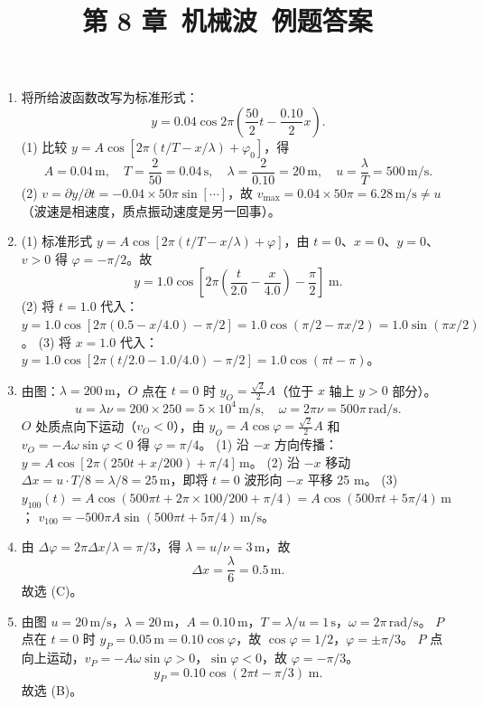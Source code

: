 \documentclass[12pt]{article}
\title{第 8 章\ 机械波\ 例题答案}
\author{}
\date{}
\begin{document}
\maketitle

\begin{enumerate}[label=\textbf{例\arabic*.}, leftmargin=*]

\item 将所给波函数改写为标准形式：
\[
  y = 0.04\cos 2\pi\!\left(\frac{50}{2}t-\frac{0.10}{2}x\right).
\]
(1) 比较 $y = A\cos[2\pi(t/T - x/\lambda)+\varphi_0]$，得
\[
  A = 0.04\,\mathrm{m},\quad T = \frac{2}{50} = 0.04\,\mathrm{s},\quad
  \lambda = \frac{2}{0.10}=20\,\mathrm{m},\quad u = \frac{\lambda}{T}=500\,\mathrm{m/s}.
\]
(2) $v = \partial y/\partial t = -0.04\times 50\pi\sin[\cdots]$，故 $v_{\max}=0.04\times 50\pi = 6.28\,\mathrm{m/s}\neq u$（波速是相速度，质点振动速度是另一回事）。

\item (1) 标准形式 $y = A\cos[2\pi(t/T - x/\lambda)+\varphi]$，由 $t=0$、$x=0$、$y=0$、$v>0$ 得 $\varphi=-\pi/2$。故
\[
  y = 1.0\cos\!\left[2\pi\!\left(\frac{t}{2.0}-\frac{x}{4.0}\right)-\frac{\pi}{2}\right]\;\mathrm{m}.
\]
(2) 将 $t=1.0$ 代入：$y=1.0\cos[2\pi(0.5-x/4.0)-\pi/2]=1.0\cos(\pi/2-\pi x/2)=1.0\sin(\pi x/2)$。
(3) 将 $x=1.0$ 代入：$y=1.0\cos[2\pi(t/2.0-1.0/4.0)-\pi/2]=1.0\cos(\pi t-\pi)$。

\item 由图：$\lambda=200\,\mathrm{m}$，$O$ 点在 $t=0$ 时 $y_O = \frac{\sqrt{2}}{2}A$（位于 $x$ 轴上 $y>0$ 部分）。
\[
  u = \lambda\nu = 200\times 250 = 5\times 10^4\,\mathrm{m/s},\quad \omega = 2\pi\nu = 500\pi\,\mathrm{rad/s}.
\]
$O$ 处质点向下运动（$v_O<0$），由 $y_O = A\cos\varphi = \frac{\sqrt{2}}{2}A$ 和 $v_O = -A\omega\sin\varphi<0$ 得 $\varphi = \pi/4$。
(1) 沿 $-x$ 方向传播：$y = A\cos[2\pi(250 t+x/200)+\pi/4]\,\mathrm{m}$。
(2) 沿 $-x$ 移动 $\Delta x = u\cdot T/8 = \lambda/8 = 25\,\mathrm{m}$，即将 $t=0$ 波形向 $-x$ 平移 25 m。
(3) $y_{100}(t) = A\cos(500\pi t + 2\pi\times 100/200 + \pi/4) = A\cos(500\pi t + 5\pi/4)\,\mathrm{m}$；
$v_{100} = -500\pi A\sin(500\pi t + 5\pi/4)\,\mathrm{m/s}$。

\item 由 $\Delta\varphi = 2\pi\Delta x/\lambda = \pi/3$，得 $\lambda = u/\nu = 3\,\mathrm{m}$，故
\[
  \Delta x = \frac{\lambda}{6} = 0.5\,\mathrm{m}.
\]
故选 (C)。

\item 由图 $u=20\,\mathrm{m/s}$，$\lambda=20\,\mathrm{m}$，$A=0.10\,\mathrm{m}$，$T=\lambda/u=1\,\mathrm{s}$，$\omega=2\pi\,\mathrm{rad/s}$。
$P$ 点在 $t=0$ 时 $y_P = 0.05\,\mathrm{m}=0.10\cos\varphi$，故 $\cos\varphi = 1/2$，$\varphi = \pm\pi/3$。
$P$ 点向上运动，$v_P = -A\omega\sin\varphi > 0$，$\sin\varphi <0$，故 $\varphi = -\pi/3$。
\[
  y_P = 0.10\cos(2\pi t - \pi/3)\;\mathrm{m}.
\]
故选 (B)。


\end{enumerate}
\end{document}
